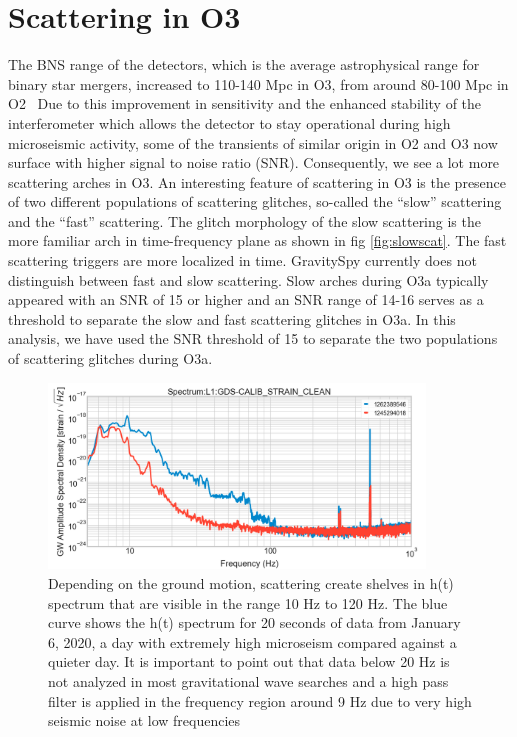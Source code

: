 \documentclass[12pt]{iopart}
\begin{document}
\section{Scattering in O3}\label{scatino3}
The BNS range of the detectors, which is the average astrophysical range for binary star mergers, increased to 110-140 Mpc in O3, from around 80-100 Mpc in O2~\cite{prospect} Due to this improvement in sensitivity and the enhanced stability of the interferometer which allows the detector to stay operational during high microseismic activity, some of the transients of similar origin in O2 and O3 now surface with higher signal to noise ratio (SNR). 
Consequently, we see a lot more scattering arches in O3. An interesting feature of scattering in O3 is the presence of two different populations of scattering glitches, so-called the ``slow'' scattering and the ``fast'' scattering. The glitch morphology of the slow scattering is the more familiar arch in time-frequency plane as shown in fig \ref{fig:slowscat}. The fast scattering triggers are more localized in time. GravitySpy currently does not distinguish between fast and slow scattering. Slow arches during O3a  typically appeared with an SNR of 15 or higher and an SNR range of 14-16 serves as a threshold to separate the slow and fast scattering glitches in O3a. In this analysis, we have used the SNR threshold of 15 to separate the two populations of scattering glitches during O3a.
\begin{figure}[h]
    \centering
    \includegraphics[width=10cm]{scat_shelf6.png}
    \caption{ Depending on the ground motion, scattering create shelves in h(t) spectrum that are visible in the range 10 Hz to 120 Hz. The blue curve shows the h(t) spectrum for 20 seconds of data from January 6, 2020, a day with extremely high microseism compared against a quieter day. It is important to point out that data below 20 Hz is not analyzed in most gravitational wave searches and a high pass filter is applied in the frequency region around 9 Hz due to very high seismic noise at low frequencies \cite{viets_thesis}}
    \label{fig:scatshelf1}
\end{figure}
\end{document}
